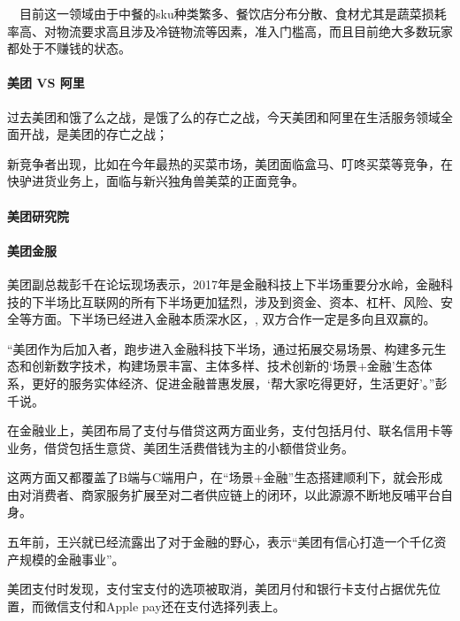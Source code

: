 \documentclass[letterpaper,11pt,english]{sphinxmanual}
\begin{document}
　目前这一领域由于中餐的sku种类繁多、餐饮店分布分散、食材尤其是蔬菜损耗率高、对物流要求高且涉及冷链物流等因素，准入门槛高，而且目前绝大多数玩家都处于不赚钱的状态。


\paragraph{美团 VS 阿里}
\label{\detokenize{chapter_company/meituan:id10}}
过去美团和饿了么之战，是饿了么的存亡之战，今天美团和阿里在生活服务领域全面开战，是美团的存亡之战；

新竞争者出现，比如在今年最热的买菜市场，美团面临盒马、叮咚买菜等竞争，在快驴进货业务上，面临与新兴独角兽美菜的正面竞争。


\paragraph{美团研究院}
\label{\detokenize{chapter_company/meituan:id11}}


\paragraph{美团金服}
\label{\detokenize{chapter_company/meituan:id12}}
美团副总裁彭千在论坛现场表示，2017年是金融科技上下半场重要分水岭，金融科技的下半场比互联网的所有下半场更加猛烈，涉及到资金、资本、杠杆、风险、安全等方面。下半场已经进入金融本质深水区，,
双方合作一定是多向且双赢的。

“美团作为后加入者，跑步进入金融科技下半场，通过拓展交易场景、构建多元生态和创新数字技术，构建场景丰富、主体多样、技术创新的‘场景+金融’生态体系，更好的服务实体经济、促进金融普惠发展，‘帮大家吃得更好，生活更好’。”彭千说。

在金融业上，美团布局了支付与借贷这两方面业务，支付包括月付、联名信用卡等业务，借贷包括生意贷、美团生活费\sphinxhyphen{}借钱为主的小额借贷业务。

这两方面又都覆盖了B端与C端用户，在“场景+金融”生态搭建顺利下，就会形成由对消费者、商家服务扩展至对二者供应链上的闭环，以此源源不断地反哺平台自身。

五年前，王兴就已经流露出了对于金融的野心，表示“美团有信心打造一个千亿资产规模的金融事业”。

美团支付时发现，支付宝支付的选项被取消，美团月付和银行卡支付占据优先位置，而微信支付和Apple
pay还在支付选择列表上。%
\begin{footnote}[915]\sphinxAtStartFootnote
{}
%
\end{footnote}
\end{document}
